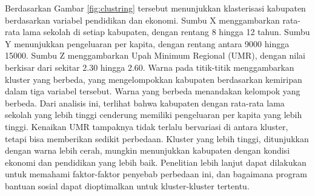 \documentclass[12pt,a4paper]{article}
\begin{document}
\begin{multicols}{2}
Berdasarkan Gambar \ref{fig:clustring} tersebut menunjukkan klasterisasi kabupaten berdasarkan variabel pendidikan dan ekonomi. Sumbu X menggambarkan rata-rata lama sekolah di setiap kabupaten, dengan rentang 8 hingga 12 tahun. Sumbu Y menunjukkan pengeluaran per kapita, dengan rentang antara 9000 hingga 15000. Sumbu Z menggambarkan Upah Minimum Regional (UMR), dengan nilai berkisar dari sekitar 2.30 hingga 2.60. Warna pada titik-titik menggambarkan kluster yang berbeda, yang mengelompokkan kabupaten berdasarkan kemiripan dalam tiga variabel tersebut. Warna yang berbeda menandakan kelompok yang berbeda. Dari analisis ini, terlihat bahwa kabupaten dengan rata-rata lama sekolah yang lebih tinggi cenderung memiliki pengeluaran per kapita yang lebih tinggi. Kenaikan UMR tampaknya tidak terlalu bervariasi di antara kluster, tetapi bisa memberikan sedikit perbedaan. Kluster yang lebih tinggi, ditunjukkan dengan warna lebih cerah, mungkin menunjukkan kabupaten dengan kondisi ekonomi dan pendidikan yang lebih baik. Penelitian lebih lanjut dapat dilakukan untuk memahami faktor-faktor penyebab perbedaan ini, dan bagaimana program bantuan sosial dapat dioptimalkan untuk kluster-kluster tertentu.

\begin{table}[H]
\small
\centering
\caption{Data Kabupaten Bengkulu}
\label{tab:data_hasil_cluster}
\end{table}



\end{multicols}
\end{document}
